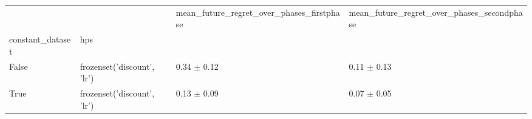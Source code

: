 \begin{tabular}{llll}
\toprule
 &  & mean_future_regret_over_phases_firstphase & mean_future_regret_over_phases_secondphase \\
constant_dataset & hps &  &  \\
\midrule
False & frozenset({'discount', 'lr'}) & 0.34 $\pm$ 0.12 & 0.11 $\pm$ 0.13 \\
\cline{1-4}
True & frozenset({'discount', 'lr'}) & 0.13 $\pm$ 0.09 & 0.07 $\pm$ 0.05 \\
\cline{1-4}
\bottomrule
\end{tabular}
